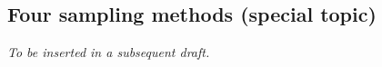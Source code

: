 \begin{doublespace}
\subsection{Four sampling methods (special topic)}

\textit{To be inserted in a subsequent draft.}

\end{doublespace}
